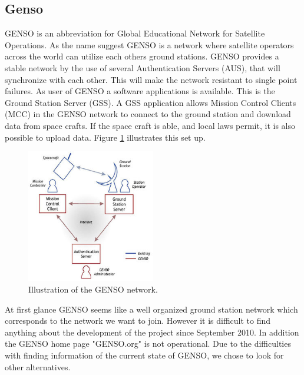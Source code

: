\subsection{Genso}
GENSO is an abbreviation for Global Educational Network for Satellite Operations. As the name suggest GENSO is a network where satellite operators across the world can utilize each others ground stations. GENSO provides a stable network by the use of several Authentication Servers (AUS), that will synchronize with each other. This will make the network resistant to single point failures. As user of GENSO a software applications is available. This is the Ground Station Server (GSS). A GSS application allows Mission Control Clients (MCC) in the GENSO network to connect to the ground station and download data from space crafts. If the space craft is able, and local laws permit, it is also possible to upload data\cite{GENSO}. Figure \ref{GENSO_network} illustrates this set up.   

\begin{figure}
	\begin{center}
		\includegraphics[width=0.5\textwidth]{Figures/GENSO_network.jpg}
	\end{center}
	\caption{Illustration of the GENSO network.}
	\label{GENSO_network}
\end{figure}

At first glance GENSO seems like a well organized ground station network which corresponds to the network we want to join. However it is difficult to find anything about the development of the project since September 2010. In addition the GENSO home page "GENSO.org" is not operational. Due to the difficulties with finding information of the current state of GENSO, we chose to look for other alternatives. 